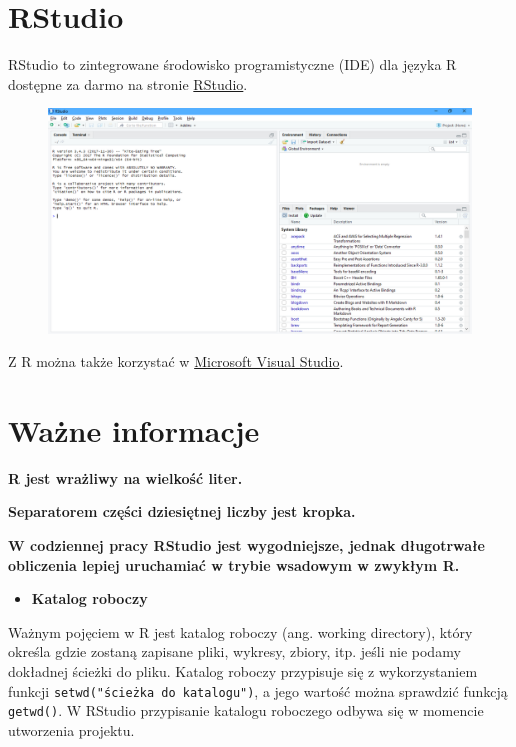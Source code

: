\documentclass[]{book}
\providecommand{\tightlist}{%
  \setlength{\itemsep}{0pt}\setlength{\parskip}{0pt}}
\begin{document}
\section{RStudio}\label{rstudio}

RStudio to zintegrowane środowisko programistyczne (IDE) dla języka R
dostępne za darmo na stronie
\href{https://www.rstudio.com/products/rstudio/download/}{RStudio}.

\begin{figure}
\centering
\includegraphics{img/rstudio.png}
\caption{}
\end{figure}

Z R można także korzystać w
\href{https://www.visualstudio.com/pl/vs/rtvs/}{Microsoft Visual
Studio}.

\section{Ważne informacje}\label{wazne-informacje}

\textbf{R jest wrażliwy na wielkość liter.}

\textbf{Separatorem części dziesiętnej liczby jest kropka.}

\textbf{W codziennej pracy RStudio jest wygodniejsze, jednak długotrwałe
obliczenia lepiej uruchamiać w trybie wsadowym w zwykłym R.}

\begin{itemize}
\tightlist
\item
  \textbf{Katalog roboczy}
\end{itemize}

Ważnym pojęciem w R jest katalog roboczy (ang. working directory), który
określa gdzie zostaną zapisane pliki, wykresy, zbiory, itp. jeśli nie
podamy dokładnej ścieżki do pliku. Katalog roboczy przypisuje się z
wykorzystaniem funkcji \texttt{setwd("ścieżka\ do\ katalogu")}, a jego
wartość można sprawdzić funkcją \texttt{getwd()}. W RStudio przypisanie
katalogu roboczego odbywa się w momencie utworzenia projektu.
\end{document}
